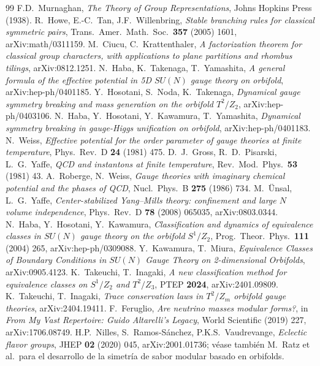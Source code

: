 \documentclass[11pt,a4paper]{article}
\begin{document}
\begin{thebibliography}{99}
 F.D.~Murnaghan, \emph{The Theory of Group Representations}, Johns
Hopkins Press (1938).
 R.~Howe, E.-C.~Tan, J.F.~Willenbring, \emph{Stable branching
rules for classical symmetric pairs}, Trans.\ Amer.\ Math.\ Soc.\ \textbf{357} (2005) 1601,
arXiv:math/0311159.
 M.~Ciucu, C.~Krattenthaler, \emph{A factorization theorem for
classical group characters, with applications to plane partitions and rhombus tilings},
arXiv:0812.1251.
 N.~Haba, K.~Takenaga, T.~Yamashita, \emph{A general formula of the effective
potential in 5D $SU(N)$ gauge theory on orbifold}, arXiv:hep-ph/0401185.
 Y.~Hosotani, S.~Noda, K.~Takenaga, \emph{Dynamical gauge symmetry breaking and
mass generation on the orbifold $T^2/Z_2$}, arXiv:hep-ph/0403106.
 N.~Haba, Y.~Hosotani, Y.~Kawamura, T.~Yamashita, \emph{Dynamical symmetry
breaking in gauge-Higgs unification on orbifold}, arXiv:hep-ph/0401183.
 N.~Weiss, \emph{Effective potential for the order parameter of gauge theories
at finite temperature}, Phys.\ Rev.\ D \textbf{24} (1981) 475.
 D.~J.~Gross, R.~D.~Pisarski, L.~G.~Yaffe, \emph{QCD and instantons at finite
temperature}, Rev.\ Mod.\ Phys.\ \textbf{53} (1981) 43.
 A.~Roberge, N.~Weiss, \emph{Gauge theories with imaginary chemical
potential and the phases of QCD}, Nucl.\ Phys.\ B \textbf{275} (1986) 734.
 M.~\"Unsal, L.~G.~Yaffe, \emph{Center-stabilized Yang--Mills theory:
confinement and large $N$ volume independence}, Phys.\ Rev.\ D \textbf{78} (2008) 065035,
arXiv:0803.0344.
 N.~Haba, Y.~Hosotani, Y.~Kawamura, \emph{Classification and dynamics of
equivalence classes in $SU(N)$ gauge theory on the orbifold $S^1/Z_2$}, Prog.\ Theor.\ Phys.\
\textbf{111} (2004) 265, arXiv:hep-ph/0309088.
 Y.~Kawamura, T.~Miura, \emph{Equivalence Classes of Boundary
Conditions in $SU(N)$ Gauge Theory on 2-dimensional Orbifolds}, arXiv:0905.4123.
\bibitem{Takeuchi1} K.~Takeuchi, T.~Inagaki, \emph{A new classification method for
equivalence classes on $S^1/Z_2$ and $T^2/Z_3$}, PTEP \textbf{2024}, arXiv:2401.09809.
\bibitem{Takeuchi2} K.~Takeuchi, T.~Inagaki, \emph{Trace conservation laws in $T^2/Z_m$
orbifold gauge theories}, arXiv:2404.19411.
 F.~Feruglio, \emph{Are neutrino masses modular forms?}, in
\emph{From My Vast Repertoire: Guido Altarelli's Legacy}, World Scientific (2019) 227,
arXiv:1706.08749.
 H.P.~Nilles, S.~Ramos-S\'anchez, P.K.S.~Vaudrevange, \emph{Eclectic
flavor groups}, JHEP \textbf{02} (2020) 045, arXiv:2001.01736; véase también M.~Ratz et al.\
para el desarrollo de la simetría de sabor modular basado en orbifolds.
\end{thebibliography}
\end{document}
